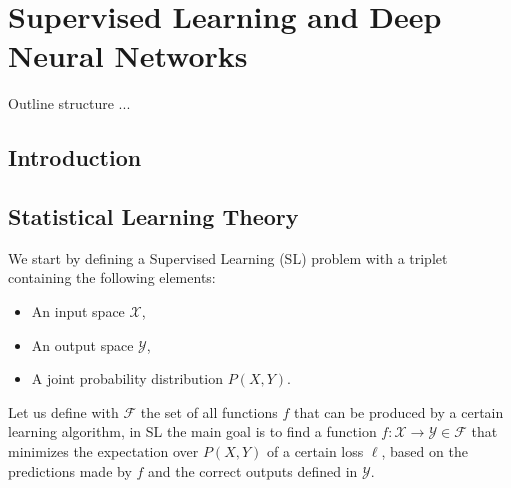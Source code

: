 \chapter{Supervised Learning and Deep Neural Networks}
\label{ch:supervised_learning}

\begin{remark}{Outline}
structure ...
\end{remark}

\section{Introduction}
\label{sec:introduction01}


\section{Statistical Learning Theory}
\label{sec:learning_from_data}

We start by defining a Supervised Learning (SL) problem with a triplet containing the following elements:
\begin{itemize}
	\item An input space $\mathcal{X}$,
	\item An output space $\mathcal{Y}$,
	\item A joint probability distribution $P(X,Y)$.
\end{itemize}
Let us define with $\mathcal{F}$ the set of all functions $f$ that can be produced by a certain learning algorithm, in SL the main goal is to find a function $f:\mathcal{X}\rightarrow\mathcal{Y} \in \mathcal{F}$ that minimizes the expectation over $P(X,Y)$ of a certain loss $\ell$, based on the predictions made by $f$ and the correct outputs defined in $\mathcal{Y}$.

